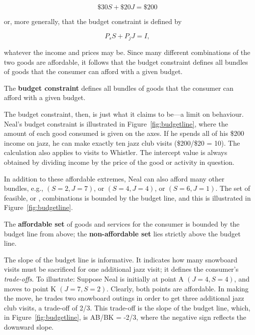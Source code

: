 \begin{equation*}
\$30S+\$20J=\$200
\end{equation*}

or, more generally, that the budget constraint is defined by

\begin{equation} \label{eq:budgetconstraint}
P_sS+P_jJ=I,
\end{equation}

whatever the income and prices may be. Since many different combinations of the two goods are affordable, it follows that the budget constraint defines all bundles of goods that the consumer can afford with a given budget.

\begin{DefBox}
The \textbf{budget constraint} defines all bundles of goods that the consumer can afford with a given budget.
\end{DefBox}

The budget constraint, then, is just what it claims to be---a limit on behaviour. Neal's budget constraint is illustrated in Figure~\ref{fig:budgetline}, where the amount of each good consumed is given on the axes. If he spends all of his \$200 income on jazz, he can make exactly ten jazz club visits (\$200/\$20 = 10). The calculation also applies to visits to Whistler. The intercept value is always obtained by dividing income by the price of the good or activity in question.



In addition to these affordable extremes, Neal can also afford many other bundles, e.g., $(S=2,J=7)$, or $(S=4,J=4)$, or $(S=6,J=1)$. The set of feasible, or , combinations is bounded by the budget line, and this is illustrated in Figure~\ref{fig:budgetline}.

\begin{DefBox}
The \textbf{affordable set} of goods and services for the consumer is bounded by the budget line from above; the \textbf{non-affordable set} lies strictly above the budget line.
\end{DefBox}

The slope of the budget line is informative. It indicates how many snowboard visits must be sacrificed for one additional jazz visit; it defines the consumer's \textit{trade-offs}. To illustrate: Suppose Neal is initially at point A $(J=4,S=4)$, and moves to point K $(J=7,S=2)$. Clearly, both points are affordable. In making the move, he trades two snowboard outings in order to get three additional jazz club visits, a trade-off of 2/3. This trade-off is the slope of the budget line, which, in Figure~\ref{fig:budgetline}, is AB/BK = -2/3, where the negative sign reflects the downward slope.

